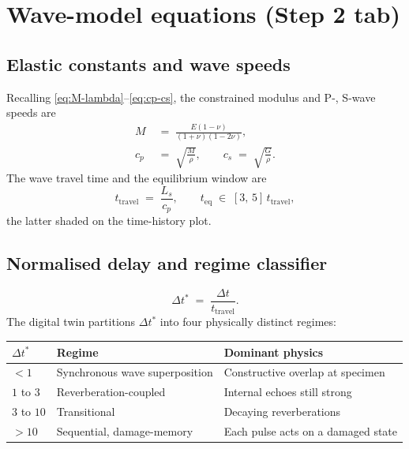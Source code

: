 \documentclass[11pt,a4paper,openany]{book}
\theoremstyle{handbook}
\newcommand{\Ls}{L_s}
\begin{document}
\section{Wave-model equations (Step 2 tab)}\label{sec:wave-regime}

\subsection{Elastic constants and wave speeds}

Recalling \eqref{eq:M-lambda}--\eqref{eq:cp-cs}, the constrained modulus
and P-, S-wave speeds are
\begin{align}
  M &\;=\; \frac{E(1-\nu)}{(1+\nu)(1-2\nu)}, \\
  c_p &\;=\; \sqrt{\frac{M}{\rho}},
  \qquad c_s \;=\; \sqrt{\frac{G}{\rho}}.
\end{align}
The wave travel time and the equilibrium window are
\begin{equation}
  t_{\text{travel}} \;=\; \frac{\Ls}{c_p},
  \qquad
  t_{\text{eq}} \;\in\; [3,\,5]\,t_{\text{travel}},
\end{equation}
the latter shaded on the time-history plot.

\subsection{Normalised delay and regime classifier}

\begin{equation}
  \Delta t^{\ast} \;=\; \frac{\Delta t}{t_{\text{travel}}}.
\end{equation}
The digital twin partitions $\Delta t^{\ast}$ into four physically
distinct regimes:
\begin{center}
\renewcommand{\arraystretch}{1.25}
\begin{tabular}{@{}lll@{}}
\toprule
$\Delta t^{\ast}$ & Regime & Dominant physics \\
\midrule
$< 1$ & Synchronous wave superposition & Constructive overlap at specimen \\
$1$ to $3$ & Reverberation-coupled & Internal echoes still strong \\
$3$ to $10$ & Transitional & Decaying reverberations \\
$> 10$ & Sequential, damage-memory & Each pulse acts on a damaged state \\
\bottomrule
\end{tabular}
\end{center}
\end{document}
